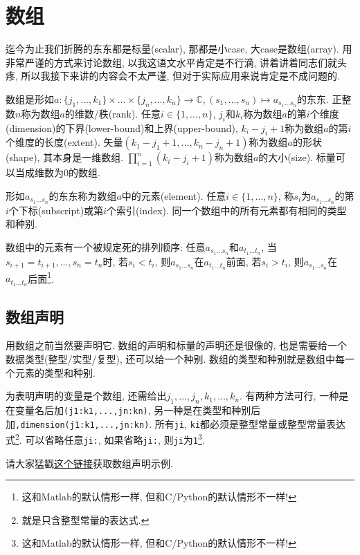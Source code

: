 \chapter{数组}\label{fortran_array}

迄今为止我们折腾的东东都是标量(scalar), 那都是小case, 大case是数组(array). 用非常严谨的方式来讨论数组, 以我这语文水平肯定是不行滴, 讲着讲着同志们就头疼, 所以我接下来讲的内容会不太严谨, 但对于实际应用来说肯定是不成问题的.

数组是形如$a\!:\!\{j_1,\dots,k_1\}\!\times\!\dots\!\times\!\{j_n,\dots,k_n\}\rightarrow\mathbb{C},(s_1,\dots,s_n)\mapsto a_{s_1\dots s_n}$的东东. 正整数$n$称为数组$a$的维数/秩(rank). 任意$i\in\{1,\dots,n\}$, $j_i$和$k_i$称为数组$a$的第$i$个维度(dimension)的下界(lower-bound)和上界(upper-bound), $k_i-j_i+1$称为数组$a$的第$i$个维度的长度(extent). 矢量$(k_1-j_1+1,\dots,k_n-j_n+1)$称为数组$a$的形状(shape), 其本身是一维数组. $\prod_{i=1}^n(k_i-j_i+1)$称为数组$a$的大小(size). 标量可以当成维数为$0$的数组.

形如$a_{s_1\dots s_n}$的东东称为数组$a$中的元素(element). 任意$i\in\{1,\dots,n\}$, 称$s_i$为$a_{s_1\dots s_n}$的第$i$个下标(subscript)或第$i$个索引(index). 同一个数组中的所有元素都有相同的类型和种别.

数组中的元素有一个被规定死的排列顺序: 任意$a_{s_1\dots s_n}$和$a_{t_1\dots t_n}$, 当$s_{i+1}=t_{i+1},\dots,s_n=t_n$时, 若$s_i<t_i$, 则$a_{s_1\dots s_n}$在$a_{t_1\dots t_n}$前面, 若$s_i>t_i$, 则$a_{s_1\dots s_n}$在$a_{t_1\dots t_n}$后面\footnote{这和Matlab的默认情形一样, 但和C/Python的默认情形不一样!}.

\section{数组声明}\label{fortran_array_specification}

用数组之前当然要声明它. 数组的声明和标量的声明还是很像的, 也是需要给一个数据类型(整型/实型/复型), 还可以给一个种别. 数组的类型和种别就是数组中每一个元素的类型和种别.

为表明声明的变量是个数组, 还需给出$j_1,\dots,j_n,k_1,\dots,k_n$. 有两种方法可行, 一种是在变量名后加\verb|(j1:k1,...,jn:kn)|, 另一种是在类型和种别后加\verb|,dimension(j1:k1,...,jn:kn)|. 所有\verb|ji|, \verb|ki|都必须是整型常量或整型常量表达式\footnote{
    就是只含整型常量的表达式.
}. 可以省略任意\verb|ji:|, 如果省略\verb|ji:|, 则\verb|ji|为\verb|1|\footnote{这和Matlab的默认情形一样, 但和C/Python的默认情形不一样!}.

请大家猛戳\href{https://fortran-lang.org/learn/quickstart/arrays_strings#array-declaration}{这个链接}获取数组声明示例.

